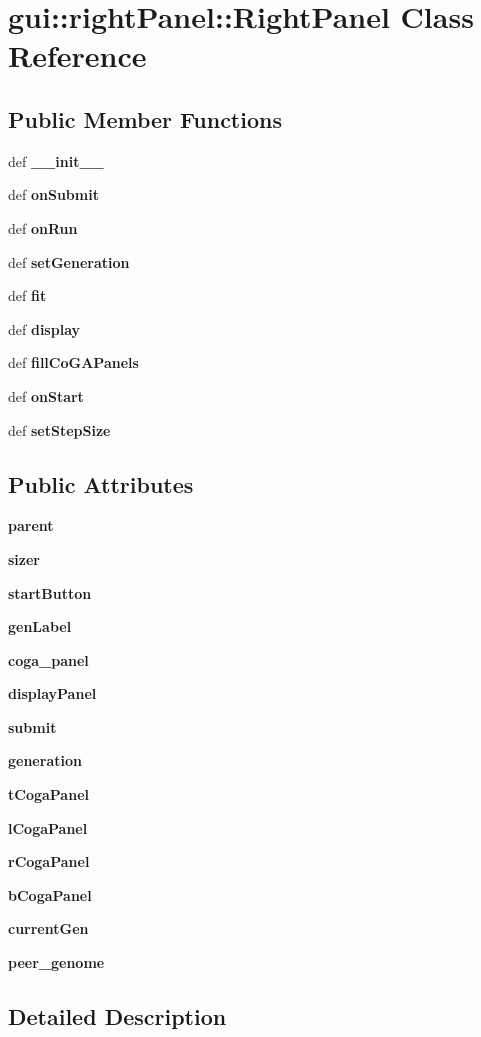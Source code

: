 \section{gui::rightPanel::RightPanel Class Reference}
\label{classgui_1_1rightPanel_1_1RightPanel}
\subsection*{Public Member Functions}
\begin{CompactItemize}
\item 
def {\bf \_\-\_\-init\_\-\_\-}
\item 
def {\bf onSubmit}
\item 
def {\bf onRun}
\item 
def {\bf setGeneration}
\item 
def {\bf fit}
\item 
def {\bf display}
\item 
def {\bf fillCoGAPanels}
\item 
def {\bf onStart}
\item 
def {\bf setStepSize}
\end{CompactItemize}
\subsection*{Public Attributes}
\begin{CompactItemize}
\item 
{\bf parent}
\item 
{\bf sizer}
\item 
{\bf startButton}
\item 
{\bf genLabel}
\item 
{\bf coga\_\-panel}
\item 
{\bf displayPanel}
\item 
{\bf submit}
\item 
{\bf generation}
\item 
{\bf tCogaPanel}
\item 
{\bf lCogaPanel}
\item 
{\bf rCogaPanel}
\item 
{\bf bCogaPanel}
\item 
{\bf currentGen}
\item 
{\bf peer\_\-genome}
\end{CompactItemize}


\subsection{Detailed Description}


